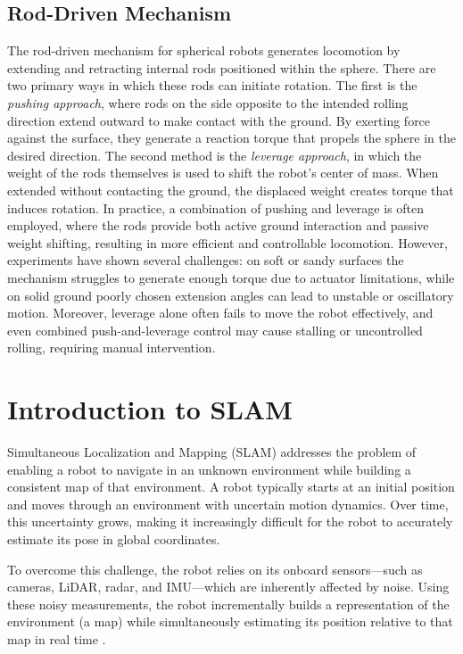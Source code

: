 \documentclass[english, bachelor, utf8]{base/thesis_telematics}
\begin{document}
\subsection{Rod-Driven Mechanism}
The rod-driven mechanism for spherical robots generates locomotion by extending and retracting internal rods positioned within the sphere. 
There are two primary ways in which these rods can initiate rotation. 
The first is the \textit{pushing approach}, where rods on the side opposite to the intended rolling direction extend outward to make contact with the ground. 
By exerting force against the surface, they generate a reaction torque that propels the sphere in the desired direction. 
The second method is the \textit{leverage approach}, in which the weight of the rods themselves is used to shift the robot’s center of mass. 
When extended without contacting the ground, the displaced weight creates torque that induces rotation. 
In practice, a combination of pushing and leverage is often employed, where the rods provide both active ground interaction and passive weight shifting, resulting in more efficient and controllable locomotion. 
However, experiments have shown several challenges: on soft or sandy surfaces the mechanism struggles to generate enough torque due to actuator limitations, while on solid ground poorly chosen extension angles can lead to unstable or oscillatory motion. 
Moreover, leverage alone often fails to move the robot effectively, and even combined push-and-leverage control may cause stalling or uncontrolled rolling, requiring manual intervention. \cite{rod_sphere}



\section{Introduction to SLAM}
Simultaneous Localization and Mapping (SLAM) addresses the problem of enabling a robot to navigate in an unknown environment while building a consistent map of that environment.
A robot typically starts at an initial position and moves through an environment with uncertain motion dynamics. 
Over time, this uncertainty grows, making it increasingly difficult for the robot to accurately estimate its pose in global coordinates. 

To overcome this challenge, the robot relies on its onboard sensors---such as cameras, LiDAR, radar, and IMU---which are inherently affected by noise. 
Using these noisy measurements, the robot incrementally builds a representation of the environment (a map) while simultaneously estimating its position relative to that map in real time \cite{slam_problem}. 
\end{document}
